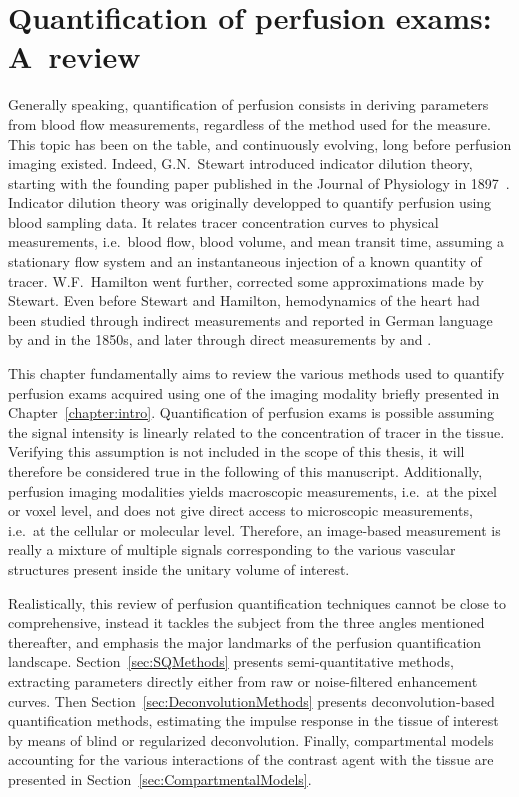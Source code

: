 \chapter{Quantification of perfusion exams: A~review}\label{chapter:review}

Generally speaking, quantification of perfusion consists in deriving parameters from blood flow measurements, regardless of the method used for the measure. 
This topic has been on the table, and continuously evolving, long before perfusion imaging existed. 
Indeed, G.N.~Stewart introduced indicator dilution theory, starting with the founding paper published in the Journal of Physiology in 1897~\cite{Stewart:1897dz}. 
Indicator dilution theory was originally developped to quantify perfusion using blood sampling data.
It relates tracer concentration curves to physical measurements, i.e.~blood flow, blood volume, and mean transit time, assuming a stationary flow system and an instantaneous injection of a known quantity of tracer.
W.F.~Hamilton went further, corrected some approximations made by Stewart.
Even before Stewart and Hamilton, hemodynamics of the heart had been studied  through indirect measurements and reported in German language by \citet{Volkmann:1850us} and \citet{Vierordt:82xUDMVI} in the 1850s, and later through direct measurements by \citet{Stolnikow:1886wm} and \citet{Tigerstedt:1891wn}.

This chapter fundamentally aims to review the various methods used to quantify perfusion exams acquired using one of the imaging modality briefly presented in Chapter~\ref{chapter:intro}. 
Quantification of perfusion exams is possible assuming the signal intensity is linearly related to the concentration of tracer in the tissue. 
Verifying this assumption is not included in the scope of this thesis, it will therefore be considered true in the following of this manuscript.
Additionally, perfusion imaging modalities yields macroscopic measurements, i.e.~at the pixel or voxel level, and does not give direct access to microscopic measurements, i.e.~at the cellular or molecular level.
Therefore, an image-based measurement is really a mixture of multiple signals corresponding to the various vascular structures present inside the unitary volume of interest. 

Realistically, this review of perfusion quantification techniques cannot be close to comprehensive, instead it tackles the subject from the three angles mentioned thereafter, and emphasis the major landmarks of the perfusion quantification landscape.
Section~\ref{sec:SQMethods} presents semi-quantitative methods, extracting parameters directly either from raw or noise-filtered enhancement curves. 
Then Section~\ref{sec:DeconvolutionMethods} presents deconvolution-based quantification methods, estimating the impulse response in the tissue of interest by means of blind or regularized deconvolution.
Finally, compartmental models accounting for the various interactions of the contrast agent with the tissue are presented in Section~\ref{sec:CompartmentalModels}. 

